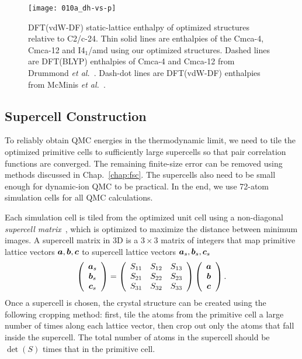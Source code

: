 \begin{figure}[h]
\centering
\texttt{[image: 010a\_dh-vs-p]}
\caption{DFT(vdW-DF) static-lattice enthalpy of optimized structures relative to C2/c-24. Thin solid lines are enthalpies of the Cmca-4, Cmca-12 and I4$_1$/amd using our optimized structures. Dashed lines are DFT(BLYP) enthalpies of Cmca-4 and Cmca-12 from Drummond \textit{et al.}~\cite{Drummond2015}. Dash-dot lines are DFT(vdW-DF) enthalpies from McMinis \textit{et al.}~\cite{McMinis2015}.}
\label{fig:dft-opt-geo}
\end{figure}

\subsection{Supercell Construction}
To reliably obtain QMC energies in the thermodynamic limit, we need to tile the optimized primitive cells to sufficiently large supercells so that pair correlation functions are converged.
The remaining finite-size error can be removed using methods discussed in Chap.~\ref{chap:fsc}.
The supercells also need to be small enough for dynamic-ion QMC to be practical.
In the end, we use 72-atom simulation cells for all QMC calculations.

Each simulation cell is tiled from the optimized unit cell using a non-diagonal \emph{supercell matrix}~\cite{Lloyd-Williams2015}, which is optimized to maximize the distance between minimum images.
A supercell matrix in 3D is a $3\times 3$ matrix of integers that map primitive lattice vectors $\boldsymbol{a}, \boldsymbol{b}, \boldsymbol{c}$ to supercell lattice vectors  $\boldsymbol{a}_s, \boldsymbol{b}_s, \boldsymbol{c}_s$
\begin{align}
\left(\begin{array}{c}
\boldsymbol{a}_s \\
\boldsymbol{b}_s \\
\boldsymbol{c}_s
\end{array}\right) =
\left(\begin{array}{ccc}
S_{11} & S_{12} & S_{13} \\
S_{21} & S_{22} & S_{23} \\
S_{31} & S_{32} & S_{33}
\end{array}\right)
\left(\begin{array}{c}
\boldsymbol{a} \\
\boldsymbol{b} \\
\boldsymbol{c}
\end{array}\right).
\end{align}
Once a supercell is chosen, the crystal structure can be created using the following cropping method: first, tile the atoms from the primitive cell a large number of times along each lattice vector, then crop out only the atoms that fall inside the supercell.
The total number of atoms in the supercell should be $\det(S)$ times that in the primitive cell.

